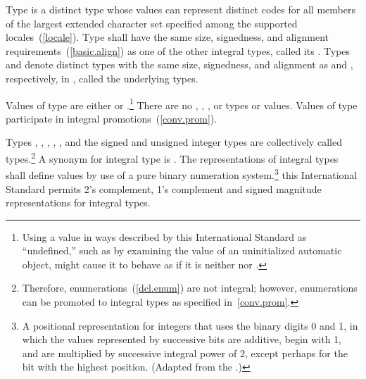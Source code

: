 \pnum
{}%
%
%
%
%
Type  is a distinct type whose values can represent
distinct codes for all members of the largest extended character set
specified among the supported locales~(\ref{locale}). Type
 shall have the same size, signedness, and alignment
requirements~(\ref{basic.align}) as one of the other integral types,
called its . Types  and
 denote distinct types with the same size, signedness,
and alignment as  and ,
respectively, in , called the underlying types.

\pnum
{}%
Values of type  are either  or
.\footnote{Using a  value in ways described by this International
Standard as ``undefined,'' such as by examining the value of an
uninitialized automatic object, might cause it to behave as if it is
neither  nor .}
\enternote There are no , , ,
or  types or values. \exitnote Values of type
 participate in integral promotions~(\ref{conv.prom}).

\pnum
Types , , , ,
, and the signed and unsigned integer types are
collectively called
%
 types.\footnote{Therefore, enumerations~(\ref{dcl.enum}) are not integral; however,
enumerations can be promoted to integral types as specified
in~\ref{conv.prom}.}
A synonym for integral type is
%
. The representations of integral types shall
define values by use of  a pure binary numeration system.\footnote{A positional
representation for integers that uses the binary digits 0
and 1, in which the values represented by successive bits are additive,
begin with 1, and are multiplied by successive integral power of 2,
except perhaps for the bit with the highest position. (Adapted from the
.)}
\enterexample this International Standard permits 2's complement, 1's
complement and signed magnitude representations for integral types.
\exitexample

